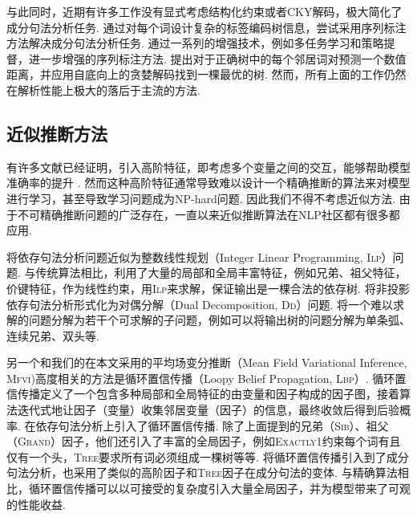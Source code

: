 与此同时，近期有许多工作没有显式考虑结构化约束或者CKY解码，极大简化了成分句法分析任务.
\citet{gomez-rodriguez-vilares-2018-constituent}通过对每个词设计复杂的标签编码树信息，尝试采用序列标注方法解决成分句法分析任务.
\citet{vilares-etal-2019-better}通过一系列的增强技术，例如多任务学习和策略提督，进一步增强的序列标注方法.
\citet{shen-etal-2018-straight}提出对于正确树中的每个邻居词对预测一个数值距离，并应用自底向上的贪婪解码找到一棵最优的树.
然而，所有上面的工作仍然在解析性能上极大的落后于主流的方法.

\subsection{近似推断方法}
有许多文献已经证明，引入高阶特征，即考虑多个变量之间的交互，能够帮助模型准确率的提升
\citep{mcdonald-pereira-2006-online,carreras-2007-experiments,koo-collins-2010-efficient,ma-zhao-2012-fourth}.
然而这种高阶特征通常导致难以设计一个精确推断的算法来对模型进行学习，甚至导致学习问题成为NP-hard问题\citep{mcdonald-pereira-2006-online}.
因此我们不得不考虑近似方法.
由于不可精确推断问题的广泛存在，一直以来近似推断算法在NLP社区都有很多都应用.

\citet{martins-etal-2009-concise}将依存句法分析问题近似为整数线性规划（Integer Linear Programming, \textsc{Ilp}）问题.
与传统算法相比，\citet{martins-etal-2009-concise}利用了大量的局部和全局丰富特征，例如兄弟、祖父特征，价键特征，作为线性约束，用\textsc{Ilp}来求解，保证输出是一棵合法的依存树.
\citet{koo-etal-2010-dual}将非投影依存句法分析形式化为对偶分解（Dual Decomposition, \textsc{Dd}）问题.
将一个难以求解的问题分解为若干个可求解的子问题，例如可以将输出树的问题分解为单条弧、连续兄弟、双头等\citep{martins-etal-2011-dual}.

另一个和我们的在本文采用的平均场变分推断（Mean Field Variational Inference, \textsc{Mfvi})高度相关的方法是循环置信传播（Loopy Belief Propagation, \textsc{Lbp}）.
循环置信传播定义了一个包含多种局部和全局特征的由变量和因子构成的因子图，接着算法迭代式地让因子（变量）收集邻居变量（因子）的信息，最终收敛后得到后验概率.
\cite{smith-eisner-2008-dependency,gormley-etal-2015-approximation}在依存句法分析上引入了循环置信传播.
除了上面提到的兄弟（\textsc{Sib}）、祖父（\textsc{Grand}）因子，他们还引入了丰富的全局因子，例如\textsc{Exactly1}约束每个词有且仅有一个头，\textsc{Tree}要求所有词必须组成一棵树等等.
\citet{naradowsky-etal-2012-grammarless}将循环置信传播引入到了成分句法分析，也采用了类似的高阶因子和\textsc{Tree}因子在成分句法的变体.
与精确算法相比，循环置信传播可以以可接受的复杂度引入大量全局因子，并为模型带来了可观的性能收益.

